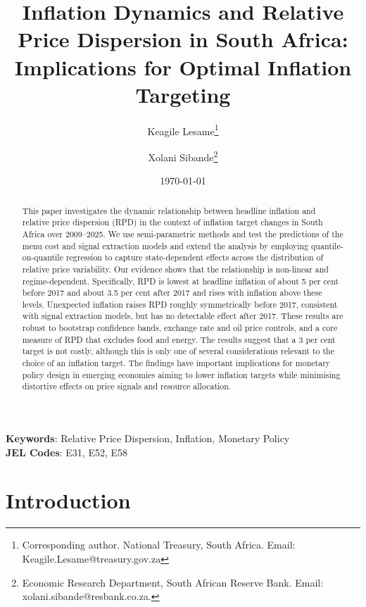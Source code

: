 \documentclass[
  letterpaper,
  DIV=11,
  numbers=noendperiod]{scrartcl}
\author{}
\date{}
\begin{document}
\title{Inflation Dynamics and Relative Price Dispersion in South Africa: Implications for Optimal Inflation Targeting}
\author {Keagile Lesame\footnote{Corresponding author. National Treasury, South Africa. Email: Keagile.Lesame@treasury.gov.za} \and
Xolani Sibande\footnote{Economic Research Department, South African Reserve Bank. Email: xolani.sibande@resbank.co.za.}}


\date{\today}
\maketitle

\begingroup{}
\begin{abstract}

This paper investigates the dynamic relationship between headline inflation and relative price dispersion (RPD) in the context of inflation target changes in South Africa over 2009–2025. We use semi-parametric methods and test the predictions of the menu cost and signal extraction models and extend the analysis by employing quantile-on-quantile regression to capture state-dependent effects across the distribution of relative price variability. Our evidence shows that the relationship is non-linear and regime-dependent. Specifically, RPD is lowest at headline inflation of about 5 per cent before 2017 and about 3.5 per cent after 2017 and rises with inflation above these levels. Unexpected inflation raises RPD roughly symmetrically before 2017, consistent with signal extraction models, but has no detectable effect after 2017. These results are robust to bootstrap confidence bands, exchange rate and oil price controls, and a core measure of RPD that excludes food and energy. The results suggest that a 3 per cent target is not costly, although this is only one of several considerations relevant to the choice of an inflation target. The findings have important implications for monetary policy design in emerging economies aiming to lower inflation targets while minimising distortive effects on price signals and resource allocation.

\end{abstract}

\noindent\textbf{Keywords}: Relative Price Dispersion, Inflation, Monetary Policy\\
\textbf{JEL Codes}: E31, E52, E58
\endgroup
\newpage

\section{Introduction}\label{introduction}
\end{document}
